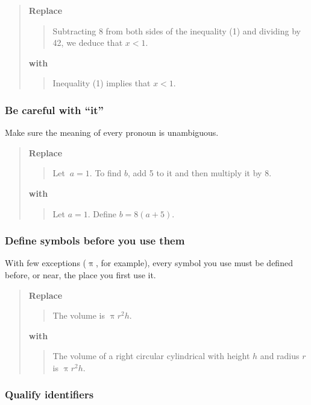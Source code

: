 \documentclass[12pt,fleqn]{article}
\newcounter{ex}\setcounter{ex}{0}
\newcounter{id}\setcounter{id}{0}
\newcounter{se}\setcounter{se}{0}
\begin{document}
\begin{quote}
\textbf{Replace}
\begin{quote}
Subtracting 8 from both sides of the inequality (1)  and dividing by 42,
we deduce that \(x < 1\).
\end{quote}
\textbf{with}
\begin{quote}
Inequality (1) implies that \(x < 1\).
\end{quote}
\end{quote}

 \subsubsection{ Be careful with ``it''}

Make sure the meaning of every pronoun is unambiguous.

\begin{quote}
\textbf{\textbf{Replace}}
\begin{quote}
   Let \(\ a = 1\). To find \(b\), add 5 to it and then multiply it by 8.
\end{quote}
\textbf{with} 
\begin{quote}
   Let \(a = 1\).  Define \(b = 8 (a + 5)\).
\end{quote}
\end{quote}

 \subsubsection{ Define symbols before you use them}

With few exceptions (\(\uppi\), for example), every symbol you use must be defined
before, or near, the place you first use it.

\begin{quote}
\textbf{\textbf{Replace}}
\begin{quote}
The volume is \(\uppi r^2 h\).
\end{quote}
\textbf{with}
\begin{quote}
The volume of a right circular cylindrical with height \(h\) and
radius \(r\) is \(\uppi r^2 h\).

\end{quote}
\end{quote}
 \subsubsection{  Qualify identifiers} 
\end{document}
